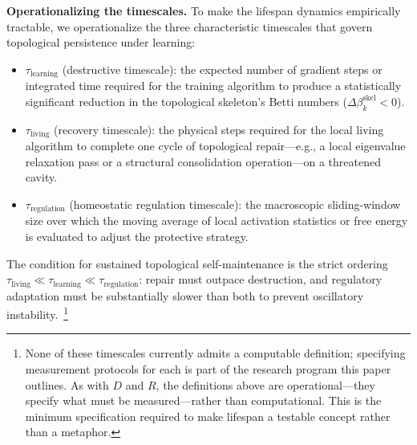 \documentclass{article}
\begin{document}
\noindent\textbf{Operationalizing the timescales.}
To make the lifespan dynamics empirically tractable, we operationalize the three characteristic timescales that govern topological persistence under learning:
\begin{itemize}
    \item $\tau_{\text{learning}}$ (destructive timescale): the expected number of gradient steps or integrated time required for the training algorithm to produce a statistically significant reduction in the topological skeleton's Betti numbers ($\Delta \beta_k^{\text{skel}} < 0$).
    \item $\tau_{\text{living}}$ (recovery timescale): the physical steps required for the local living algorithm to complete one cycle of topological repair---e.g., a local eigenvalue relaxation pass or a structural consolidation operation---on a threatened cavity.
    \item $\tau_{\text{regulation}}$ (homeostatic regulation timescale): the macroscopic sliding-window size over which the moving average of local activation statistics or free energy is evaluated to adjust the protective strategy.
\end{itemize}
The condition for sustained topological self-maintenance is the strict ordering $\tau_{\text{living}} \ll \tau_{\text{learning}} \ll \tau_{\text{regulation}}$: repair must outpace destruction, and regulatory adaptation must be substantially slower than both to prevent oscillatory instability.\
\footnote{None of these timescales currently admits a computable definition; specifying measurement protocols for each is part of the research program this paper outlines. As with $D$ and $R$, the definitions above are operational---they specify what must be measured---rather than computational. This is the minimum specification required to make lifespan a testable concept rather than a metaphor.}
\end{document}
